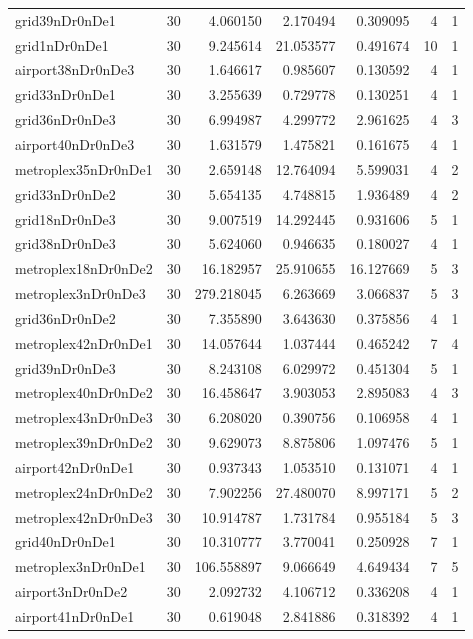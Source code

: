 \begin{longtable}{|l|r|r|r|r|r|r|}
grid39nDr0nDe1 & 30 & 4.060150 & 2.170494 & 0.309095 & 4 & 1 \\
grid1nDr0nDe1 & 30 & 9.245614 & 21.053577 & 0.491674 & 10 & 1 \\
airport38nDr0nDe3 & 30 & 1.646617 & 0.985607 & 0.130592 & 4 & 1 \\
grid33nDr0nDe1 & 30 & 3.255639 & 0.729778 & 0.130251 & 4 & 1 \\
grid36nDr0nDe3 & 30 & 6.994987 & 4.299772 & 2.961625 & 4 & 3 \\
airport40nDr0nDe3 & 30 & 1.631579 & 1.475821 & 0.161675 & 4 & 1 \\
metroplex35nDr0nDe1 & 30 & 2.659148 & 12.764094 & 5.599031 & 4 & 2 \\
grid33nDr0nDe2 & 30 & 5.654135 & 4.748815 & 1.936489 & 4 & 2 \\
grid18nDr0nDe3 & 30 & 9.007519 & 14.292445 & 0.931606 & 5 & 1 \\
grid38nDr0nDe3 & 30 & 5.624060 & 0.946635 & 0.180027 & 4 & 1 \\
metroplex18nDr0nDe2 & 30 & 16.182957 & 25.910655 & 16.127669 & 5 & 3 \\
metroplex3nDr0nDe3 & 30 & 279.218045 & 6.263669 & 3.066837 & 5 & 3 \\
grid36nDr0nDe2 & 30 & 7.355890 & 3.643630 & 0.375856 & 4 & 1 \\
metroplex42nDr0nDe1 & 30 & 14.057644 & 1.037444 & 0.465242 & 7 & 4 \\
grid39nDr0nDe3 & 30 & 8.243108 & 6.029972 & 0.451304 & 5 & 1 \\
metroplex40nDr0nDe2 & 30 & 16.458647 & 3.903053 & 2.895083 & 4 & 3 \\
metroplex43nDr0nDe3 & 30 & 6.208020 & 0.390756 & 0.106958 & 4 & 1 \\
metroplex39nDr0nDe2 & 30 & 9.629073 & 8.875806 & 1.097476 & 5 & 1 \\
airport42nDr0nDe1 & 30 & 0.937343 & 1.053510 & 0.131071 & 4 & 1 \\
metroplex24nDr0nDe2 & 30 & 7.902256 & 27.480070 & 8.997171 & 5 & 2 \\
metroplex42nDr0nDe3 & 30 & 10.914787 & 1.731784 & 0.955184 & 5 & 3 \\
grid40nDr0nDe1 & 30 & 10.310777 & 3.770041 & 0.250928 & 7 & 1 \\
metroplex3nDr0nDe1 & 30 & 106.558897 & 9.066649 & 4.649434 & 7 & 5 \\
airport3nDr0nDe2 & 30 & 2.092732 & 4.106712 & 0.336208 & 4 & 1 \\
airport41nDr0nDe1 & 30 & 0.619048 & 2.841886 & 0.318392 & 4 & 1 \\

\end{longtable}
